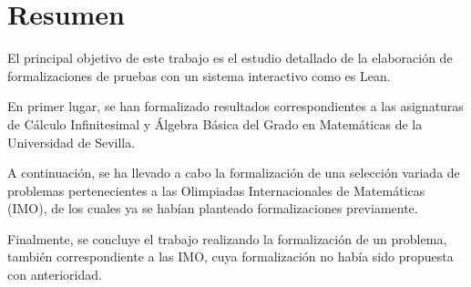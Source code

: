 \chapter*{Resumen}

El principal objetivo de este trabajo es el estudio detallado
de la elaboración de formalizaciones de pruebas con un
sistema interactivo como es Lean.

En primer lugar, se han formalizado resultados correspondientes
a las asignaturas de Cálculo Infinitesimal y Álgebra Básica del
Grado en Matemáticas de la Universidad de Sevilla.

A continuación, se ha llevado a cabo la formalización de una
selección variada de problemas pertenecientes a las Olimpiadas
Internacionales de Matemáticas (IMO), de los cuales ya se
habían planteado formalizaciones previamente.

Finalmente, se concluye el trabajo realizando la formalización
de un problema, también correspondiente a las IMO, cuya
formalización no había sido propuesta con anterioridad.


